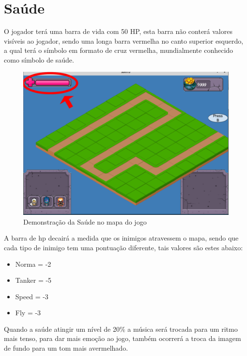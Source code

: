 \documentclass[11pt]{article} %
\begin{document}
\newpage

\section{Saúde}

O jogador terá uma barra de vida com 50 HP, esta barra não conterá valores visíveis ao jogador, sendo uma longa barra vermelha no canto superior esquerdo, a qual terá o símbolo em formato de cruz vermelha, mundialmente conhecido como símbolo de saúde.

\begin{figure}[!htp]
\centering
\includegraphics[scale=0.3]{res/saude.png}
\caption{Demonstração da Saúde no mapa do jogo}
\label{Saúde}
\end{figure}
 
A barra de hp decairá a medida que os inimigos atravessem o mapa, sendo que cada tipo de inimigo tem uma pontuação diferente, tais valores são estes abaixo:

\begin{itemize}
 \item Norma = -2 
 \item Tanker = -5
 \item Speed = -3
 \item Fly = -3
 \end{itemize} 

Quando a saúde atingir um nível de 20\% a música será trocada para um ritmo mais tenso, para dar mais emoção ao jogo, também ocorrerá a troca da imagem de fundo para um tom mais avermelhado.
\end{document}
